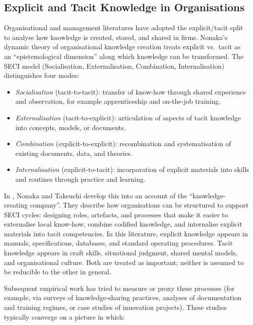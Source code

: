 \subsection{Explicit and Tacit Knowledge in Organisations}

Organisational and management literatures have adopted the explicit/tacit split to analyse how knowledge is created, stored, and shared in firms. Nonaka's dynamic theory of organisational knowledge creation \cite{Nonaka1994} treats explicit vs.\ tacit as an ``epistemological dimension'' along which knowledge can be transformed. The SECI model (Socialisation, Externalisation, Combination, Internalisation) distinguishes four modes:

\begin{itemize}
  \item \emph{Socialisation} (tacit-to-tacit): transfer of know-how through shared experience and observation, for example apprenticeship and on-the-job training.
  \item \emph{Externalisation} (tacit-to-explicit): articulation of aspects of tacit knowledge into concepts, models, or documents.
  \item \emph{Combination} (explicit-to-explicit): recombination and systematisation of existing documents, data, and theories.
  \item \emph{Internalisation} (explicit-to-tacit): incorporation of explicit materials into skills and routines through practice and learning.
\end{itemize}

In \cite{NonakaTakeuchi1995}, Nonaka and Takeuchi develop this into an account of the ``knowledge-creating company''. They describe how organisations can be structured to support SECI cycles: designing roles, artefacts, and processes that make it easier to externalise local know-how, combine codified knowledge, and internalise explicit materials into tacit competencies. In this literature, explicit knowledge appears in manuals, specifications, databases, and standard operating procedures. Tacit knowledge appears in craft skills, situational judgment, shared mental models, and organisational culture. Both are treated as important; neither is assumed to be reducible to the other in general.

Subsequent empirical work has tried to measure or proxy these processes (for example, via surveys of knowledge-sharing practices, analyses of documentation and training regimes, or case studies of innovation projects). These studies typically converge on a picture in which:

